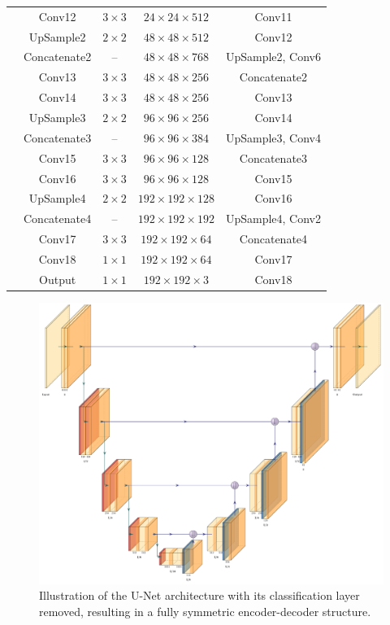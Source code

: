 \begin{table}[htbp]
\begin{tabular}{lcccc}
    & Conv12       & $3 \times 3$ & $24 \times 24 \times 512$  & Conv11 \\ 
    & UpSample2    & $2 \times 2$ & $48 \times 48 \times 512$  & Conv12 \\ 
    & Concatenate2 & --           & $48 \times 48 \times 768$  & UpSample2, Conv6 \\ 
    & Conv13       & $3 \times 3$ & $48 \times 48 \times 256$  & Concatenate2 \\ 
    & Conv14       & $3 \times 3$ & $48 \times 48 \times 256$  & Conv13 \\ 
    & UpSample3    & $2 \times 2$ & $96 \times 96 \times 256$  & Conv14 \\ 
    & Concatenate3 & --           & $96 \times 96 \times 384$  & UpSample3, Conv4 \\ 
    & Conv15       & $3 \times 3$ & $96 \times 96 \times 128$  & Concatenate3 \\ 
    & Conv16       & $3 \times 3$ & $96 \times 96 \times 128$  & Conv15 \\ 
    & UpSample4    & $2 \times 2$ & $192 \times 192 \times 128$ & Conv16 \\ 
    & Concatenate4 & --           & $192 \times 192 \times 192$ & UpSample4, Conv2 \\ 
    & Conv17       & $3 \times 3$ & $192 \times 192 \times 64$  & Concatenate4 \\ 
    & Conv18       & $1 \times 1$ & $192 \times 192 \times 64$  & Conv17 \\ 
    & Output       & $1 \times 1$ & $192 \times 192 \times 3$   & Conv18 \\ 
\bottomrule
\end{tabular}
\end{table}

\begin{figure}
    \centering
    \includegraphics[width=0.85\paperwidth, keepaspectratio]{img/ch6/architectures/unet.pdf}
    \caption{Illustration of the U-Net architecture \cite{ronneberger_u-net_2015} with its classification layer removed, resulting in a fully symmetric encoder-decoder structure.}
    \label{fig:unet-architecture}
\end{figure}


